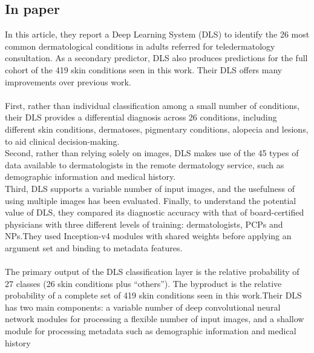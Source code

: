 \subsection{In paper\cite{r6}}
In this article, they report a Deep Learning System (DLS) to identify the 26 most common dermatological conditions in adults referred for teledermatology consultation. As a secondary predictor, DLS also produces predictions for the full cohort of the 419 skin conditions seen in this work. Their DLS offers many improvements over previous work.\\\\
First, rather than individual classification among a small number of conditions, their DLS provides a differential diagnosis across 26 conditions, including different skin conditions, dermatoses, pigmentary conditions, alopecia and lesions, to aid clinical decision-making.\\
Second, rather than relying solely on images, DLS makes use of the 45 types of data available to dermatologists in the remote dermatology service, such as demographic information and medical history.\\
Third, DLS supports a variable number of input images, and the usefulness of using multiple images has been evaluated. Finally, to understand the potential value of DLS, they compared its diagnostic accuracy with that of board-certified physicians with three different levels of training: dermatologists, PCPs and NPs.They used Inception-v4 modules with shared weights before applying an argument set and binding to metadata features.\\\\

The primary output of the DLS classification layer is the relative probability of 27 classes (26 skin conditions plus “others”). The byproduct is the relative probability of a complete set of 419 skin conditions seen in this work.Their DLS has two main components: a variable number of deep convolutional neural network modules for processing a flexible number of input images, and a shallow module for processing metadata such as demographic information and medical history\\\\

